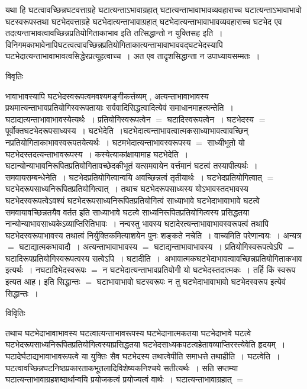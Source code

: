 \documentclass[10pt, openany]{book}
\begin{document}
{{\la यथा हि घटत्वावच्छिन्नघटवत्ताग्रहे घटात्यन्ताऽभावाग्रहात् घटात्यन्ताभावाभावव्यवहाराच्च घटात्यन्ताऽभावाभावो घटस्वरूपस्तथा घटभेदवत्ताग्रहे घटभेदात्यन्ताभावाग्रहात् घटभेदात्यन्ताभावाभावव्यवहाराच्च घटभेद एव तदत्यन्ताभावत्वावच्छिन्नप्रतियोगिताकाभाव इति तत्सिद्धान्तो न युक्तिसह इति~। विनिगमकाभावेनापिघटत्वत्वावच्छिन्नप्रतियोगिताकात्यन्ताभावाभाववद्घटभेदस्यापि घटभेदात्यन्ताभावाभावत्वसिद्धेरप्रत्यूहत्वाच्च~। अत एव तादृृशसिद्धान्ता न उपाध्यायसम्मतः~।~}
\begin{center}     विवृतिः \end{center}
भावाभावस्यापि घटभेदस्वरूपत्वमवश्यमङ्गीकर्त्तव्यम् , अत्यन्ताभावाभावस्य प्रथमात्यन्ताभावप्रतियोगिस्वरूपतायाः सर्ववादिसिद्धत्वादित्येवं समाधानमाहत्यन्तेति~। घटाद्यत्यन्ताभावाभावस्येत्यर्थः~। प्रतियोगिस्वरूपत्वेन $=$ घटादिस्वरूपत्वेन~। घटभेदस्य $=$ पूर्वोक्तघटभेदरूपसाध्यस्य~। घटभेदेति~।घटभेदात्यन्ताभावत्वात्मकसाध्याभावत्वावच्छिन् नप्रतियोगिताकाभावस्वरूपतयेत्यर्थः~। घटमभेदात्यन्ताभावस्वरूपस्य $=$ साध्यीभूतो यो घटभेदस्तदत्यन्ताभावरूपस्य~। कस्येत्याकांक्षायामाह घटभेदेति~। घटान्योन्याभावनिरूपितप्रतियोगितावच्छेदकीभूतं यत्समवायेन वर्त्तमानं घटत्वं तस्यापीत्यर्थः~। {\qt समवायसम्बन्धेनेति}~।
घटभेदप्रतियोगित्वान्वयि अवच्छिन्नत्वं तृतीयार्थः~। घटभेदप्रतियोगित्वात् $=$ घटभेदरूपसाध्यनिरूपितप्रतियोगित्वात्~। तथाच घटभेदरूपसाध्यस्य योऽभावस्तदभावस्य घटभेदस्वरूपत्वेऽवश्यं घटभेदरूपसाध्यनिरूपितप्रतियोगित्वं साध्याभावे घटभेदाभावाभावे घटत्वे समवायावच्छिन्नतयैव वर्तत इति साध्याभावे घटत्वे साध्यनिरूपितप्रतियोगित्वस्य प्रसिद्धतया नान्योन्याभावसाध्यकेऽव्याप्तिरितिभावः~। नन्वस्तु भावस्य घटादेरत्यन्ताभावाभावस्वरूपत्वं तथापि घटभेदस्वरूपाभावस्य तथात्वं निर्युक्तिकमित्याशयेन पुनः शङ्कते नचेति~। वाच्यमिति परेणान्वयः~। अन्यत्र $=$ घटाद्यात्मकभावादौ~। अत्यन्ताभावाभावस्य $=$ घटाद्यन्ताभावाभावस्य~। प्रतियोगिस्वरूपत्वेऽपि $=$ घटादिरूपप्रतियोगिस्वरूपत्वस्य सत्वेऽपि~। {\la घटादीति~}।~अभावात्मकघटभेदाभावत्वावच्छिन्नप्रतियोगिताकभाव इत्यर्थः~। नघटादिभेदस्वरूपः $=$ न घटभेदात्यन्ताभावप्रतियोगी यो घटभेदस्तदात्मकः~। तर्हि किं स्वरूप इत्यत आह। इति सिद्धान्तः $=$ घटाभावाभावो घटस्वरूपः न तु घटभेदाभावाभावो घटभेदस्वरूप इत्येवं सिद्धान्तः~।
\newpage
\begin{center}
विविृतिः    
\end{center}
तथाच घटभेदाभावाभावस्य घटत्वात्यन्ताभावरूपस्य घटभेदानात्मकतया घटभेदाभावे घटत्वे घटभेदरूपसाध्यनिरूपितप्रतियोगित्वस्याप्रसिद्धतया घटभेदसाध्यकपटत्वहेतावव्याप्तिरस्त्येवेति हृदयम्~। घटादेर्घटाद्यभावाभावरूपत्वे या युक्तिः सैव घटभेदस्य तथात्वेपीति समाधत्ते तथाहीति~। {\qt घटत्वेति~}। घटत्वावच्छिन्नघटनिष्ठप्रकारताकभूतलादिविशेष्यकनिश्चये सतीत्यर्थः~। सति सप्तम्या घटात्यन्ताभावाग्रहशब्दार्थान्वयि प्रयोजकत्वं प्रयोज्यत्वं वार्थः~। घटात्यन्ताभावाग्रहात् $=$ 
}
\end{document}
